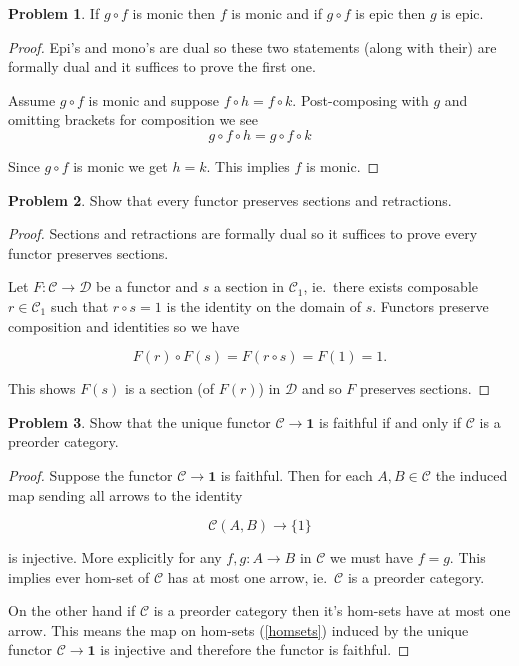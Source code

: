 \documentclass[11pt]{amsart}
\theoremstyle{plain}
\theoremstyle{definition}
\newtheorem{prob}{Problem}
\newcommand{\cC}{{\mathcal C}}
\newcommand{\cD}{{\mathcal D}}
\newcommand{\noi}{{\noindent}}
\begin{document}
\begin{prob}
If $g \circ f$ is monic then $f$ is monic and if $g \circ f$ is epic then $g$ is epic. 
\end{prob}
\begin{proof}
Epi's and mono's are dual so these two statements (along with their) are formally dual and it suffices to prove the first one. \medskip 

Assume $g \circ f$ is monic and suppose $f \circ h = f \circ k$. Post-composing with $g$ and omitting brackets for composition we see
\[ g \circ f \circ h = g \circ f \circ k \]

\noi Since $g \circ f$ is monic we get $h =k$. This implies $f$ is monic. 
\end{proof}

\begin{prob}
Show that every functor preserves sections and retractions. 
\end{prob}
\begin{proof}
Sections and retractions are formally dual so it suffices to prove every functor preserves sections. \medskip 

Let $F : \cC \to \cD$ be a functor and $s$ a section in $\cC_1$, ie.~there exists composable $r \in \cC_1$ such that $r \circ s = 1$ is the identity on the domain of $s$. Functors preserve composition and identities so we have

\[ F(r) \circ F(s) = F(r \circ s) = F(1) = 1.\]

\noi This shows $F(s)$ is a section (of $F(r)$) in $\cD$ and so $F$ preserves sections.
\end{proof}

\begin{prob}
Show that the unique functor $\cC \to \mathbf{1}$ is faithful if and only if $\cC$ is a preorder category. 
\end{prob}
\begin{proof}
Suppose the functor $\cC \to \mathbf{1}$ is faithful. Then for each $A , B \in \cC$ the induced map sending all arrows to the identity

\[ \label{homsets}\cC(A,B) \to \{ 1 \} \tag{$\star$}\]

\noi is injective. More explicitly for any $f, g : A \to B$ in $\cC$ we must have $f = g$. This implies ever hom-set of $\cC$ has at most one arrow, ie.~$\cC$ is a preorder category. \bigskip 

On the other hand if $\cC$ is a preorder category then it's hom-sets have at most one arrow. This means the map on hom-sets (\ref{homsets}) induced by the unique functor $\cC \to \mathbf{1}$ is injective and therefore the functor is faithful.  
\end{proof}
\end{document}
